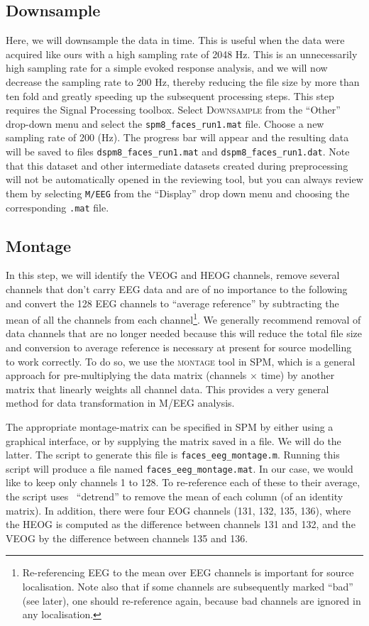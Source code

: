 \subsection{Downsample}

Here, we will downsample the data in time. This is useful when the data were acquired like ours with a high sampling rate of 2048 Hz. This is an unnecessarily high sampling rate for a simple evoked response analysis, and we will now decrease the sampling rate to 200 Hz, thereby reducing the file size by more than ten fold and greatly speeding up the subsequent processing steps. This step requires the Signal Processing toolbox. Select \textsc{Downsample} from the ``Other'' drop-down menu and select the \texttt{spm8\_faces\_run1.mat} file. Choose a new sampling rate of 200 (Hz). The progress bar will appear and the resulting data will be saved to files \texttt{dspm8\_faces\_run1.mat} and \texttt{dspm8\_faces\_run1.dat}. Note that this dataset and other intermediate datasets created during preprocessing will not be automatically opened in the reviewing tool, but you can always review them by selecting \texttt{M/EEG} from the ``Display'' drop down menu and choosing the corresponding \texttt{.mat} file.

\subsection{Montage}

In this step, we will identify the VEOG and HEOG channels, remove several channels that don't carry EEG data and are of no importance to the following and convert the 128 EEG channels to ``average reference'' by subtracting the mean of all the channels from each channel\footnote{Re-referencing EEG to the mean over EEG channels is important for source localisation. Note also that if some channels are subsequently marked ``bad'' (see later), one should re-reference again, because bad channels are ignored in any localisation.}. We generally recommend removal of data channels that are no longer needed because this will reduce the total file size and conversion to average reference is necessary at present for source modelling to work correctly. To do so, we use the \textsc{montage} tool in SPM, which is a general approach for pre-multiplying the data matrix (channels $\times$ time) by another matrix that linearly weights all channel data. This provides a very general method for data transformation in M/EEG analysis.

The appropriate montage-matrix can be specified in SPM by either using a graphical interface, or by supplying the matrix saved in a file. We will do the latter. The script to generate this file is \texttt{faces\_eeg\_montage.m}. Running this script will produce a file named \texttt{faces\_eeg\_montage.mat}. In our case, we would like to keep only channels 1 to 128. To re-reference each of these to their average, the script uses \matlab\ ``detrend'' to remove the mean of each column (of an identity matrix). In addition, there were four EOG channels (131, 132, 135, 136), where the HEOG is computed as the difference between channels 131 and 132, and the VEOG by the difference between channels 135 and 136. 

